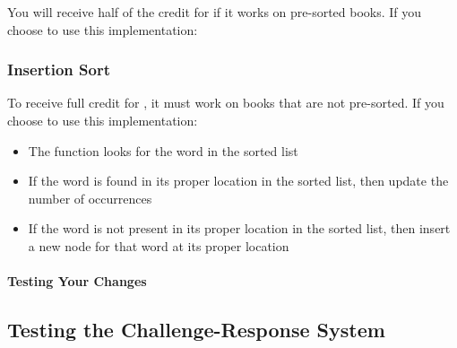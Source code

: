         You will receive half of the credit for  if it works on pre-sorted books.
        If you choose to use this implementation:
        \begin{description}
        \end{description}

    \subsubsection{Insertion Sort}

        To receive full credit for , it must work on books that are not pre-sorted.
        If you choose to use this implementation:
        \begin{description}
            \begin{itemize}
                \item The function looks for the word in the sorted list
                \item If the word is found in its proper location in the sorted list, then update the number of occurrences
                \item If the word is not present in its proper location in the sorted list, then insert a new node for that word at its proper location
            \end{itemize}
        \end{description}

    \paragraph{Testing Your Changes}

        \begin{description}
        \end{description}

    \subsection{Testing the Challenge-Response System} \label{subsec:tldrTestingChallengeResponse}

